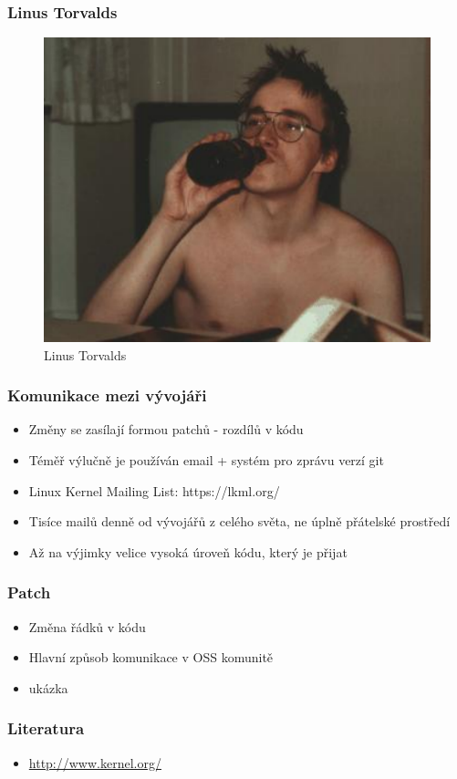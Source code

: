 \documentclass[professionalfonts,svgnames]{beamer}
\begin{document}
\begin{frame}
\frametitle{Linus Torvalds}
\begin{figure}[h]
	\includegraphics[scale=0.6]{fig/linus-torvalds-beer}
	\caption{Linus Torvalds}
	\label{linus}
\end{figure}
\end{frame}

\begin{frame}
\frametitle{Komunikace mezi vývojáři}
\begin{itemize} %
	\item Změny se zasílají formou patchů - rozdílů v kódu
	\item Téměř výlučně je používán email + systém pro zprávu verzí git
	\item Linux Kernel Mailing List: https://lkml.org/
	\item Tisíce mailů denně od vývojářů z celého světa, ne úplně přátelské prostředí
	\item Až na výjimky velice vysoká úroveň kódu, který je přijat
\end{itemize}
\end{frame}


\begin{frame}[fragile]
\frametitle{Patch}
\begin{itemize}
\item Změna řádků v kódu
\item Hlavní způsob komunikace v OSS komunitě
\item ukázka
\end{itemize}
\end{frame}



 \begin{frame}
\frametitle{Literatura}
\begin{itemize}
\item \url{http://www.kernel.org/} 
\end{itemize}
\end{frame}
\end{document}
